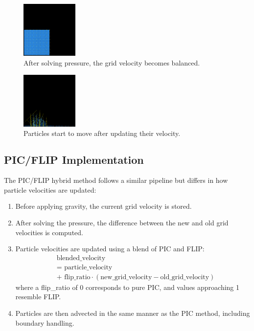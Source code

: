 \begin{figure}[h]
    \centering
    \includegraphics[width=0.25\textwidth]{figures/pic_solve_pr.png}
    \caption{After solving pressure, the grid velocity becomes balanced.}
    \label{fig:pic_pressure}
\end{figure}

\begin{figure}[h]
    \centering
    \includegraphics[width=0.25\textwidth]{figures/pic_interm.png}
    \caption{Particles start to move after updating their velocity.}
    \label{fig:pic_inter}
\end{figure}

\subsection{PIC/FLIP Implementation}

The PIC/FLIP hybrid method follows a similar pipeline but differs in how particle velocities are updated:

\begin{enumerate}
\item Before applying gravity, the current grid velocity is stored.

\item After solving the pressure, the difference between the new and old grid velocities is computed.

\item Particle velocities are updated using a blend of PIC and FLIP:
\begin{equation}
  \begin{aligned}
  &\text{blended\_velocity} \\
  &= \text{ particle\_velocity} \\
  &+ \text{ flip\_ratio} \cdot (\text{new\_grid\_velocity} - \text{old\_grid\_velocity})
  \end{aligned}
\end{equation}
where a flip\_ratio of 0 corresponds to pure PIC, and values approaching 1 resemble FLIP.

\item Particles are then advected in the same manner as the PIC method, including boundary handling.
\end{enumerate}

